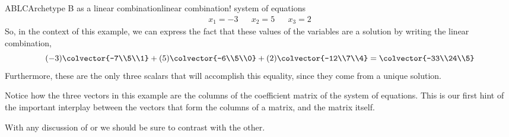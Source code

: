 \begin{example}{ABLC}{Archetype B as a linear combination}{linear combination! system of equations}
%
\begin{align*}
x_1 = -3&&x_2 = 5&&x_3 = 2
\end{align*}
%
So, in the context of this example, we can express the fact that these values of the variables are a solution by writing the linear combination,
%
\begin{equation*}
(-3)\colvector{-7\\5\\1}+
(5)\colvector{-6\\5\\0}+
(2)\colvector{-12\\7\\4}
=
\colvector{-33\\24\\5}
\end{equation*}
%
Furthermore, these are the only three scalars that will accomplish this equality, since they come from a unique solution. \par
%
Notice how the three vectors in this example are the columns of the coefficient matrix of the system of equations.  This is our first hint of the important interplay between the vectors that form the columns of a matrix, and the matrix itself.
\end{example}
%
With any discussion of  or  we should be sure to contrast with the other.
